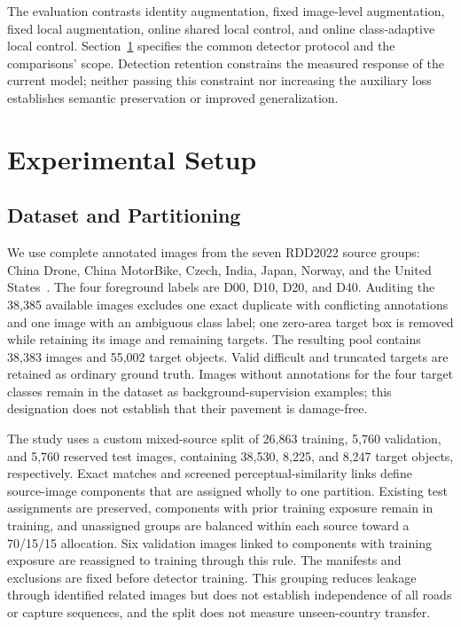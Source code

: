 \documentclass[conference]{IEEEtran}
\begin{document}
The evaluation contrasts identity augmentation, fixed image-level augmentation, fixed local augmentation, online shared local control, and online class-adaptive local control. Section~\ref{sec:experimental_setup} specifies the common detector protocol and the comparisons' scope. Detection retention constrains the measured response of the current model; neither passing this constraint nor increasing the auxiliary loss establishes semantic preservation or improved generalization.

\section{Experimental Setup}
\label{sec:experimental_setup}

\subsection{Dataset and Partitioning}
\label{sec:setup_data}
We use complete annotated images from the seven RDD2022 source groups: China Drone, China MotorBike, Czech, India, Japan, Norway, and the United States~\cite{arya2024rdd}. The four foreground labels are D00, D10, D20, and D40. Auditing the 38,385 available images excludes one exact duplicate with conflicting annotations and one image with an ambiguous class label; one zero-area target box is removed while retaining its image and remaining targets. The resulting pool contains 38,383 images and 55,002 target objects. Valid difficult and truncated targets are retained as ordinary ground truth. Images without annotations for the four target classes remain in the dataset as background-supervision examples; this designation does not establish that their pavement is damage-free.

The study uses a custom mixed-source split of 26,863 training, 5,760 validation, and 5,760 reserved test images, containing 38,530, 8,225, and 8,247 target objects, respectively. Exact matches and screened perceptual-similarity links define source-image components that are assigned wholly to one partition. Existing test assignments are preserved, components with prior training exposure remain in training, and unassigned groups are balanced within each source toward a 70/15/15 allocation. Six validation images linked to components with training exposure are reassigned to training through this rule. The manifests and exclusions are fixed before detector training. This grouping reduces leakage through identified related images but does not establish independence of all roads or capture sequences, and the split does not measure unseen-country transfer.
\end{document}
